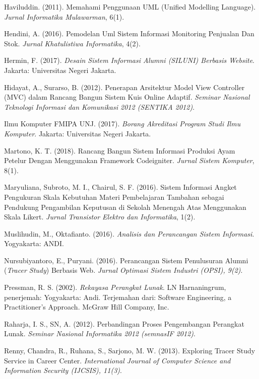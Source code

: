 \documentclass{jtetiskripsi}
\begin{document}
\begin{thebibliography}{99}
 Haviluddin. (2011). Memahami Penggunaan UML (Unified Modelling Language). \textit{Jurnal Informatika Mulawarman}, 6(1).

 Hendini, A. (2016). Pemodelan Uml Sistem Informasi Monitoring Penjualan Dan Stok. \textit{Jurnal Khatulistiwa Informatika}, 4(2).

 Hermin, F. (2017). \textit{Desain Sistem Informasi Alumni (SILUNI) Berbasis Website}. Jakarta: Universitas Negeri Jakarta.

 Hidayat, A., Surarso, B. (2012). Penerapan Arsitektur Model View Controller (MVC) dalam Rancang Bangun Sistem Kuis Online Adaptif. \textit{Seminar Nasional Teknologi Informasi dan Komunikasi 2012 (SENTIKA 2012)}.

 Ilmu Komputer FMIPA UNJ. (2017).\textit{ Borang Akreditasi Program Studi Ilmu Komputer}. Jakarta: Universitas Negeri Jakarta.

 Martono, K. T. (2018). Rancang Bangun Sistem Informasi Produksi Ayam Petelur Dengan Menggunakan Framework Codeigniter. \textit{Jurnal Sistem Komputer}, 8(1).

 Maryuliana, Subroto, M. I., Chairul, S. F. (2016). Sistem Informasi Angket Pengukuran Skala Kebutuhan Materi Pembelajaran Tambahan sebagai Pendukung Pengambilan Keputusan di Sekolah Menengah Atas Menggunakan Skala Likert. \textit{Jurnal Transistor Elektro dan Informatika}, 1(2).

 Muslihudin, M., Oktafianto. (2016). \textit{Analisis dan Perancangan Sistem Informasi}. Yogyakarta: ANDI.

 Nursubiyantoro, E., Puryani. (2016). Perancangan Sistem Penulusuran Alumni (\textit{Tracer Study}) Berbasis Web. \textit{Jurnal Optimasi Sistem Industri (OPSI), 9(2)}.

 Pressman, R. S. (2002). \textit{Rekayasa Perangkat Lunak}. LN Harnaningrum, penerjemah: Yogyakarta: Andi. Terjemahan dari: Software Engineering, a Practitioner's Approach. McGraw Hill Company, Inc.

 Raharja, I. S., SN, A. (2012). Perbandingan Proses Pengembangan Perangkat Lunak. \textit{Seminar Nasional Informatika 2012 (semnasIF 2012)}.

 Renny, Chandra, R., Ruhana, S., Sarjono, M. W. (2013). Exploring Tracer Study Service in Career Center. \textit{International Journal of Computer Science and Information Security (IJCSIS), 11(3)}.


\end{thebibliography}
\end{document}
